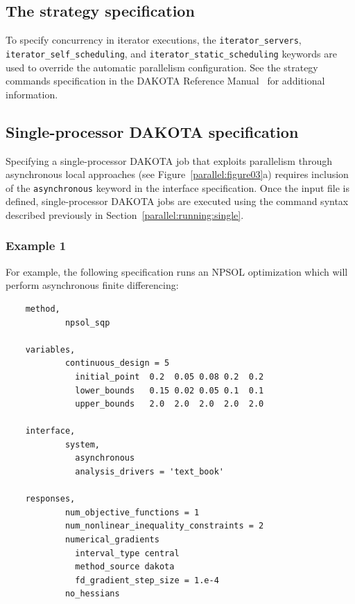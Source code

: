 \subsection{The strategy specification}\label{parallel:spec:strategy}

To specify concurrency in iterator executions, the
\texttt{iterator\_servers}, \texttt{iterator\_self\_scheduling}, and
\texttt{iterator\_static\_scheduling} keywords are used to override
the automatic parallelism configuration. See the strategy commands
specification in the DAKOTA Reference Manual~\cite{RefMan} for additional
information.

\subsection{Single-processor DAKOTA specification}\label{parallel:spec:single}

Specifying a single-processor DAKOTA job that exploits parallelism
through asynchronous local approaches (see
Figure~\ref{parallel:figure03}a) requires inclusion of the
\texttt{asynchronous} keyword in the interface specification. Once the
input file is defined, single-processor DAKOTA jobs are executed using
the command syntax described previously in
Section~\ref{parallel:running:single}.

\subsubsection{Example 1}\label{parallel:spec:single:example1}

For example, the following specification runs an NPSOL optimization
which will perform asynchronous finite differencing:
\begin{small}
\begin{verbatim}
    method,
            npsol_sqp

    variables,
            continuous_design = 5
              initial_point  0.2  0.05 0.08 0.2  0.2
              lower_bounds   0.15 0.02 0.05 0.1  0.1
              upper_bounds   2.0  2.0  2.0  2.0  2.0

    interface,
            system,
              asynchronous
              analysis_drivers = 'text_book'

    responses,
            num_objective_functions = 1
            num_nonlinear_inequality_constraints = 2
            numerical_gradients
              interval_type central
              method_source dakota
              fd_gradient_step_size = 1.e-4
            no_hessians
\end{verbatim}
\end{small}


